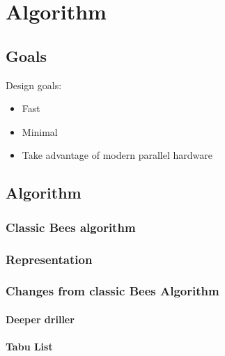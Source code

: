
\chapter{Algorithm}


\section{Goals}

Design goals:
\begin{itemize}
   \item Fast
   \item Minimal
   \item Take advantage of modern parallel hardware
\end{itemize}


\section{Algorithm}



\subsection{Classic Bees algorithm}

\subsection{Representation}

\subsection{Changes from classic Bees Algorithm}

\subsubsection{Deeper driller}

\subsubsection{Tabu List}

